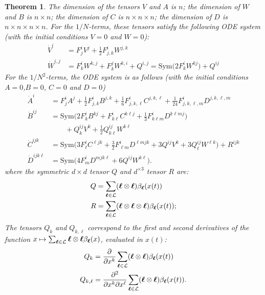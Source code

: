 \documentclass[sigconf]{acmart}
\newtheorem{theorem}{Theorem}
\newcommand\bl{{\text{\boldmath$\ell$}}}
\newcommand\calL{\mathcal{L}}
\newcommand\Sym{\mathrm{Sym}}
\begin{document}
\begin{theorem}
  The dimension of the tensors $V$ and $A$ is $n$; the dimension of
  $W$ and $B$ is $n\times n$; the dimension of $C$ is
  $n\times n\times n$; the dimension of $D$ is
  $n\times n \times n \times n$.  For the $1/N$-terms, these tensors
  satisfy the following ODE system (with the initial conditions $V=0$
  and $W=0$):
  \begin{align*}
    \dot{V}^i &= F^i_jV^j + \frac12F^i_{j,k} W^{j,k}\\
    \dot{W}^{i,j} &= F^i_kW^{k,j}+F^j_kW^{k,i} + Q^{i,j}
              = \Sym\Big(2F^{i}_kW^{kj}\Big) + Q^{ij}
  \end{align*}
  For the $1/N^2$-terms, the ODE system is as follows (with the
  initial conditions $A=0$,$B=0$, $C=0$ and $D=0$)
  \begin{align*}
    \dot{A}^i &= F^i_{j}A^j + \frac12F^{i}_{j,k}B^{j,k} + \frac16F^i_{j,k,\ell}C^{j,k,\ell}
                + \frac1{24}F^i_{j,k,\ell,m}D^{j,k,\ell,m}\\
    \dot{B}^{ij} &= \Sym\Big(2F^{i}_kB^{kj} + F^{i}_{k\ell} C^{k\ell j} +
                   \frac13 F^{i}_{k\ell m} D^{k\ell mj}\Big)\\
              &\qquad+ Q^{ij}_kV^k +
                \frac12Q^{ij}_{k\ell}W^{k\ell}\\
    \dot{C}^{ijk}&=\Sym\Big(3F^{i}_{\ell}C^{\ell jk} + \frac32
                   F^{i}_{\ell m}D^{\ell mjk} + 
                   3Q^{ij}V^{k}+3Q^{ij}_\ell W^{\ell k}\Big) + 
                   R^{ijk}\\ 
    \dot{D}^{ijk\ell} &= \Sym\Big(4 F^{i}_mD^{mjk\ell} +
                        6Q^{ij}W^{k\ell}\Big).
  \end{align*}
  where the symmetric $d\times d$ tensor $Q$ and $d^{\times3}$ tensor
  $R$ are:
  \begin{align}
    Q &= \sum_{\bl\in\calL} (\bl\otimes\bl) \beta_{\bl}(x(t))\label{eq:Q}\\
    R &= \sum_{\bl\in\calL} (\bl\otimes\bl\otimes\bl) \beta_{\bl}(x(t));
        \label{eq:R}
  \end{align}
  The tensors $Q_k$ and $Q_{k,\ell}$ correspond to the first and
  second derivatives of the function
  $x\mapsto \sum_{\bl\in\calL}\bl\otimes\bl\beta_{\bl}(x)$, evaluated in
  $x(t)$:
  \begin{align*}
    Q_k &= \frac{\partial}{\partial x^k}\sum_{\bl\in\calL} (\bl\otimes\bl)
          \beta_{\bl}(x(t)) \\
    Q_{k,\ell} &= \frac{\partial^2}{\partial x^k\partial
                  x^\ell}\sum_{\bl\in\calL} (\bl\otimes\bl) \beta_{\bl}(x(t)).
  \end{align*}
\end{theorem}
\end{document}
